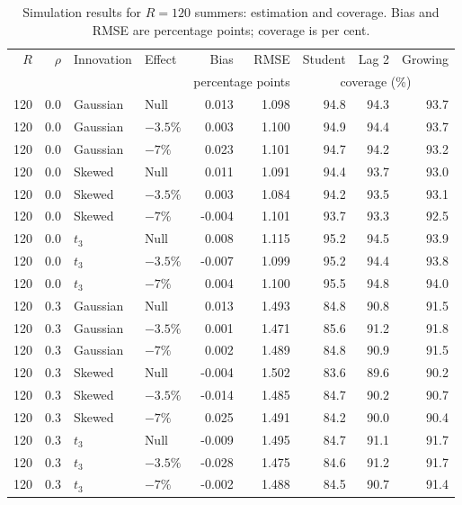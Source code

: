 \begin{table}[H]
\centering
\normalsize\renewcommand{\arraystretch}{1.55}\setlength{\tabcolsep}{4pt}
\caption{Simulation results for $R=120$ summers: estimation and coverage. Bias and RMSE are percentage points; coverage is per cent.}
\label{tab:year-simulation-complete-a-r120}
\begin{tabular*}{\textwidth}{@{\extracolsep{\fill}}rrllrrrrr}
\toprule
$R$ & $\rho$ & Innovation & Effect & Bias & RMSE & Student & Lag 2 & Growing \\
 & & & & \multicolumn{2}{c}{percentage points} & \multicolumn{3}{c}{coverage (\%)} \\
\midrule
120 & 0.0 & Gaussian & Null & 0.013 & 1.098 & 94.8 & 94.3 & 93.7 \\
120 & 0.0 & Gaussian & $-3.5\%$ & 0.003 & 1.100 & 94.9 & 94.4 & 93.7 \\
120 & 0.0 & Gaussian & $-7\%$ & 0.023 & 1.101 & 94.7 & 94.2 & 93.2 \\
120 & 0.0 & Skewed & Null & 0.011 & 1.091 & 94.4 & 93.7 & 93.0 \\
120 & 0.0 & Skewed & $-3.5\%$ & 0.003 & 1.084 & 94.2 & 93.5 & 93.1 \\
120 & 0.0 & Skewed & $-7\%$ & -0.004 & 1.101 & 93.7 & 93.3 & 92.5 \\
120 & 0.0 & $t_3$ & Null & 0.008 & 1.115 & 95.2 & 94.5 & 93.9 \\
120 & 0.0 & $t_3$ & $-3.5\%$ & -0.007 & 1.099 & 95.2 & 94.4 & 93.8 \\
120 & 0.0 & $t_3$ & $-7\%$ & 0.004 & 1.100 & 95.5 & 94.8 & 94.0 \\
120 & 0.3 & Gaussian & Null & 0.013 & 1.493 & 84.8 & 90.8 & 91.5 \\
120 & 0.3 & Gaussian & $-3.5\%$ & 0.001 & 1.471 & 85.6 & 91.2 & 91.8 \\
120 & 0.3 & Gaussian & $-7\%$ & 0.002 & 1.489 & 84.8 & 90.9 & 91.5 \\
120 & 0.3 & Skewed & Null & -0.004 & 1.502 & 83.6 & 89.6 & 90.2 \\
120 & 0.3 & Skewed & $-3.5\%$ & -0.014 & 1.485 & 84.7 & 90.2 & 90.7 \\
120 & 0.3 & Skewed & $-7\%$ & 0.025 & 1.491 & 84.2 & 90.0 & 90.4 \\
120 & 0.3 & $t_3$ & Null & -0.009 & 1.495 & 84.7 & 91.1 & 91.7 \\
120 & 0.3 & $t_3$ & $-3.5\%$ & -0.028 & 1.475 & 84.6 & 91.2 & 91.7 \\
120 & 0.3 & $t_3$ & $-7\%$ & -0.002 & 1.488 & 84.5 & 90.7 & 91.4 \\

\end{tabular*}
\end{table}
